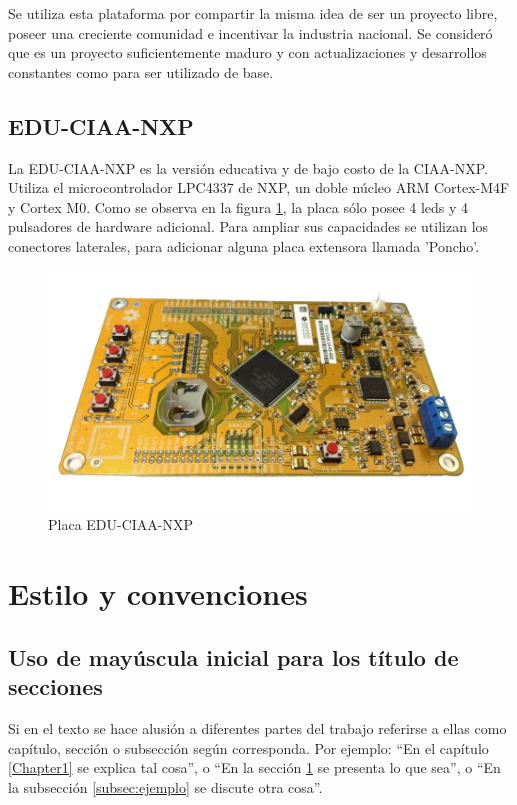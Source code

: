 Se utiliza esta plataforma por compartir la misma idea de ser un proyecto libre, poseer una creciente comunidad e incentivar la industria nacional. Se consideró que es un proyecto suficientemente maduro y con actualizaciones y desarrollos constantes como para ser utilizado de base.

\subsection{EDU-CIAA-NXP}
\label{subsec:eduCiaaNxp}
La EDU-CIAA-NXP es la versión educativa y de bajo costo de la CIAA-NXP. Utiliza el microcontrolador LPC4337 de NXP, un doble núcleo ARM Cortex-M4F y Cortex M0. Como se observa en la figura \ref{fig:eduCiaaNxp}, la placa sólo posee 4 leds y 4 pulsadores de hardware adicional. Para ampliar sus capacidades se utilizan los conectores laterales, para adicionar alguna placa extensora llamada 'Poncho'.

\begin{figure}[h]
\centering
\includegraphics[scale=.5]{./Figures/edu-ciaa-nxp.png}
\caption{Placa EDU-CIAA-NXP}
\label{fig:eduCiaaNxp}
\end{figure}

\section{Estilo y convenciones}
\label{sec:ejemplo}

\subsection{Uso de mayúscula inicial para los título de secciones}

Si en el texto se hace alusión a diferentes partes del trabajo referirse a ellas como capítulo, sección o subsección según corresponda. Por ejemplo: ``En el capítulo \ref{Chapter1} se explica tal cosa'', o ``En la sección \ref{sec:ejemplo} se presenta lo que sea'', o ``En la subsección \ref{subsec:ejemplo} se discute otra cosa''.


